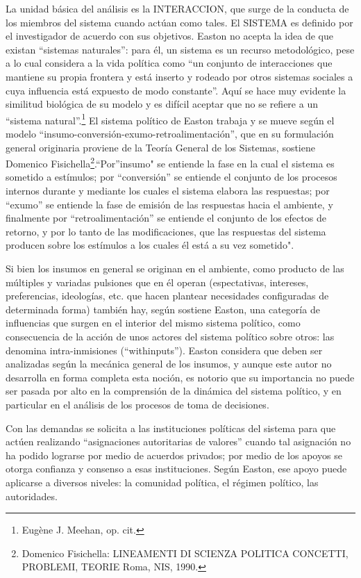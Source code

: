 \documentclass[
]{book}
\begin{document}
La unidad básica del análisis es la INTERACCION, que surge de la conducta de los miembros del sistema cuando actúan como tales. El SISTEMA es definido por el investigador de acuerdo con sus objetivos. Easton no acepta la idea de que existan ``sistemas naturales'': para él, un sistema es un recurso metodológico, pese a lo cual considera a la vida política como ``un conjunto de interacciones que mantiene su propia frontera y está inserto y rodeado por otros sistemas sociales a cuya influencia está expuesto de modo constante''. Aquí se hace muy evidente la similitud biológica de su modelo y es difícil aceptar que no se refiere a un ``sistema natural''.\footnote{Eugène J. Meehan, op. cit.} El sistema político de Easton trabaja y se mueve según el modelo ``insumo-conversión-exumo-retroalimentación'', que en su formulación general originaria proviene de la Teoría General de los Sistemas, sostiene Domenico Fisichella\footnote{Domenico Fisichella: LINEAMENTI DI SCIENZA POLITICA CONCETTI, PROBLEMI, TEORIE Roma, NIS, 1990.}.``Por''insumo" se entiende la fase en la cual el sistema es sometido a estímulos; por ``conversión'' se entiende el conjunto de los procesos internos durante y mediante los cuales el sistema elabora las respuestas; por ``exumo'' se entiende la fase de emisión de las respuestas hacia el ambiente, y finalmente por ``retroalimentación'' se entiende el conjunto de los efectos de retorno, y por lo tanto de las modificaciones, que las respuestas del sistema producen sobre los estímulos a los cuales él está a su vez sometido".

Si bien los insumos en general se originan en el ambiente, como producto de las múltiples y variadas pulsiones que en él operan (espectativas, intereses, preferencias, ideologías, etc. que hacen plantear necesidades configuradas de determinada forma) también hay, según sostiene Easton, una categoría de influencias que surgen en el interior del mismo sistema político, como consecuencia de la acción de unos actores del sistema político sobre otros: las denomina intra-inmisiones (``withinputs''). Easton considera que deben ser analizadas según la mecánica general de los insumos, y aunque este autor no desarrolla en forma completa esta noción, es notorio que su importancia no puede ser pasada por alto en la comprensión de la dinámica del sistema político, y en particular en el análisis de los procesos de toma de decisiones.

Con las demandas se solicita a las instituciones políticas del sistema para que actúen realizando ``asignaciones autoritarias de valores'' cuando tal asignación no ha podido lograrse por medio de acuerdos privados; por medio de los apoyos se otorga confianza y consenso a esas instituciones. Según Easton, ese apoyo puede aplicarse a diversos niveles: la comunidad política, el régimen político, las autoridades.
\end{document}

